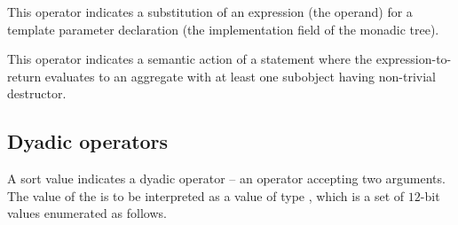 This operator indicates a substitution of an expression (the operand) for a template parameter declaration
(the implementation field of the monadic tree).

This operator indicates a semantic action of a  statement where the expression-to-return
evaluates to an aggregate with at least one subobject having non-trivial destructor.

\subsection{Dyadic operators}
\label{sec:ifc:OperatorSort:Dyadic}

A sort value  indicates a dyadic operator -- 
an operator accepting two arguments.  The
value of the  is to be interpreted as a value of type 
, which is a set of $12$-bit values enumerated as follows.
%

